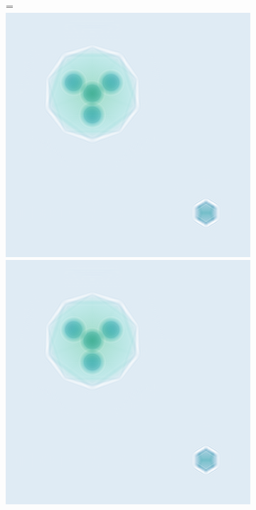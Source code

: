\begin{figure}[b] %
	\begin{subfigure}[b]{0.45\textwidth}
		=\hbox{\includegraphics[width=\textwidth]{images/fig_simholo_v2_exitwave.png}}
		\includegraphics[width=\textwidth]{images/fig_simholo_v2_exitwave.png}

\end{subfigure}
\end{figure}
